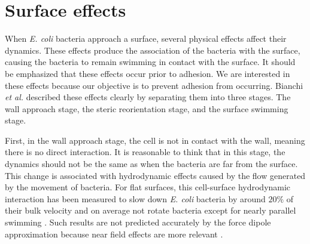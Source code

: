 \section{Surface effects}
\label{section:surface effects}



When \textit{E. coli} bacteria approach a surface, several physical effects affect their dynamics. These effects produce the association of the bacteria with the surface, causing the bacteria to remain swimming in contact with the surface. It should be emphasized that these effects occur prior to adhesion. We are interested in these effects because our objective is to prevent adhesion from occurring. Bianchi \textit{et al.} \cite{Bianchi2017HolographicBacteria} described these effects clearly by separating them into three stages. The wall approach stage, the steric reorientation stage, and the surface swimming stage.

First, in the wall approach stage, the cell is not in contact with the wall, meaning there is no direct interaction. It is reasonable to think that in this stage, the dynamics should not be the same as when the bacteria are far from the surface. This change is associated with hydrodynamic effects caused by the flow generated by the movement of bacteria. For flat surfaces, this cell-surface hydrodynamic interaction has been measured to slow down \textit{E. coli} bacteria by around $20\%$ of their bulk velocity and on average not rotate bacteria except for nearly parallel swimming \cite{Bianchi2017HolographicBacteria}. Such results are not predicted accurately by the force dipole approximation because near field effects are more relevant \cite{Drescher2011FluidScattering}. 

